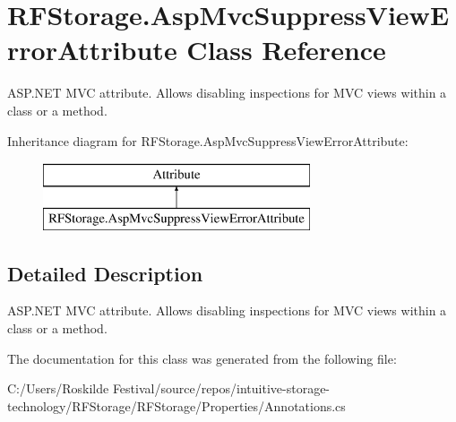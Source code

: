 \hypertarget{class_r_f_storage_1_1_asp_mvc_suppress_view_error_attribute}{}\section{R\+F\+Storage.\+Asp\+Mvc\+Suppress\+View\+Error\+Attribute Class Reference}
\label{class_r_f_storage_1_1_asp_mvc_suppress_view_error_attribute}


A\+S\+P.\+N\+ET M\+VC attribute. Allows disabling inspections for M\+VC views within a class or a method.  


Inheritance diagram for R\+F\+Storage.\+Asp\+Mvc\+Suppress\+View\+Error\+Attribute\+:\begin{figure}[H]
\begin{center}
\leavevmode
\includegraphics[height=2.000000cm]{class_r_f_storage_1_1_asp_mvc_suppress_view_error_attribute}
\end{center}
\end{figure}


\subsection{Detailed Description}
A\+S\+P.\+N\+ET M\+VC attribute. Allows disabling inspections for M\+VC views within a class or a method. 



The documentation for this class was generated from the following file\+:\begin{DoxyCompactItemize}
\item 
C\+:/\+Users/\+Roskilde Festival/source/repos/intuitive-\/storage-\/technology/\+R\+F\+Storage/\+R\+F\+Storage/\+Properties/Annotations.\+cs\end{DoxyCompactItemize}
